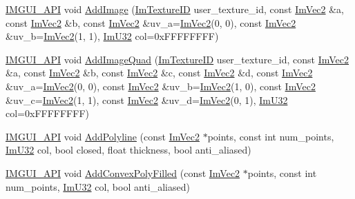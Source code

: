 \begin{DoxyCompactItemize}
\item 
\mbox{\hyperlink{imgui_8h_a43829975e84e45d1149597467a14bbf5}{I\+M\+G\+U\+I\+\_\+\+A\+PI}} void \mbox{\hyperlink{struct_im_draw_list_ac37cd998bf5f40705c7445004a029b66}{Add\+Image}} (\mbox{\hyperlink{imgui_8h_a364f4447ecbc4ca176145ccff9db6286}{Im\+Texture\+ID}} user\+\_\+texture\+\_\+id, const \mbox{\hyperlink{struct_im_vec2}{Im\+Vec2}} \&a, const \mbox{\hyperlink{struct_im_vec2}{Im\+Vec2}} \&b, const \mbox{\hyperlink{struct_im_vec2}{Im\+Vec2}} \&uv\+\_\+a=\mbox{\hyperlink{struct_im_vec2}{Im\+Vec2}}(0, 0), const \mbox{\hyperlink{struct_im_vec2}{Im\+Vec2}} \&uv\+\_\+b=\mbox{\hyperlink{struct_im_vec2}{Im\+Vec2}}(1, 1), \mbox{\hyperlink{imgui_8h_a118cff4eeb8d00e7d07ce3d6460eed36}{Im\+U32}} col=0x\+F\+F\+F\+F\+F\+F\+F\+F)
\item 
\mbox{\hyperlink{imgui_8h_a43829975e84e45d1149597467a14bbf5}{I\+M\+G\+U\+I\+\_\+\+A\+PI}} void \mbox{\hyperlink{struct_im_draw_list_a1cc1f8d4d1812c65c7887b8d5aef31fe}{Add\+Image\+Quad}} (\mbox{\hyperlink{imgui_8h_a364f4447ecbc4ca176145ccff9db6286}{Im\+Texture\+ID}} user\+\_\+texture\+\_\+id, const \mbox{\hyperlink{struct_im_vec2}{Im\+Vec2}} \&a, const \mbox{\hyperlink{struct_im_vec2}{Im\+Vec2}} \&b, const \mbox{\hyperlink{struct_im_vec2}{Im\+Vec2}} \&c, const \mbox{\hyperlink{struct_im_vec2}{Im\+Vec2}} \&d, const \mbox{\hyperlink{struct_im_vec2}{Im\+Vec2}} \&uv\+\_\+a=\mbox{\hyperlink{struct_im_vec2}{Im\+Vec2}}(0, 0), const \mbox{\hyperlink{struct_im_vec2}{Im\+Vec2}} \&uv\+\_\+b=\mbox{\hyperlink{struct_im_vec2}{Im\+Vec2}}(1, 0), const \mbox{\hyperlink{struct_im_vec2}{Im\+Vec2}} \&uv\+\_\+c=\mbox{\hyperlink{struct_im_vec2}{Im\+Vec2}}(1, 1), const \mbox{\hyperlink{struct_im_vec2}{Im\+Vec2}} \&uv\+\_\+d=\mbox{\hyperlink{struct_im_vec2}{Im\+Vec2}}(0, 1), \mbox{\hyperlink{imgui_8h_a118cff4eeb8d00e7d07ce3d6460eed36}{Im\+U32}} col=0x\+F\+F\+F\+F\+F\+F\+F\+F)
\item 
\mbox{\hyperlink{imgui_8h_a43829975e84e45d1149597467a14bbf5}{I\+M\+G\+U\+I\+\_\+\+A\+PI}} void \mbox{\hyperlink{struct_im_draw_list_a3ca939b6e4b35a93611d2d42d7e20434}{Add\+Polyline}} (const \mbox{\hyperlink{struct_im_vec2}{Im\+Vec2}} $\ast$points, const int num\+\_\+points, \mbox{\hyperlink{imgui_8h_a118cff4eeb8d00e7d07ce3d6460eed36}{Im\+U32}} col, bool closed, float thickness, bool anti\+\_\+aliased)
\item 
\mbox{\hyperlink{imgui_8h_a43829975e84e45d1149597467a14bbf5}{I\+M\+G\+U\+I\+\_\+\+A\+PI}} void \mbox{\hyperlink{struct_im_draw_list_a3ba618d0615e410dce9eaa0b80a30126}{Add\+Convex\+Poly\+Filled}} (const \mbox{\hyperlink{struct_im_vec2}{Im\+Vec2}} $\ast$points, const int num\+\_\+points, \mbox{\hyperlink{imgui_8h_a118cff4eeb8d00e7d07ce3d6460eed36}{Im\+U32}} col, bool anti\+\_\+aliased)

\end{DoxyCompactItemize}
